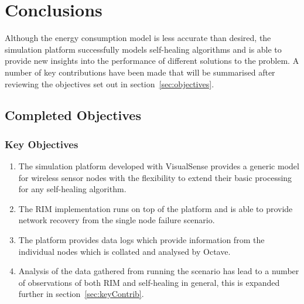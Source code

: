 \documentclass[authoryearcitations]{UoYCSproject}
\begin{document}

\chapter{Conclusions}
\label{cha:Conclusion}

%

Although the energy consumption model is less accurate than desired, the simulation platform successfully models self-healing algorithms and is able to provide new insights into the performance of different solutions to the problem. A number of key contributions have been made that will be summarised after reviewing the objectives set out in section~\ref{sec:objectives}.

\section{Completed Objectives}

\subsection{Key Objectives}
\begin{enumerate}
\item The simulation platform developed with VisualSense provides a generic model for wireless sensor nodes with the flexibility to extend their basic processing for any self-healing algorithm.
\item The RIM implementation runs on top of the platform and is able to provide network recovery from the single node failure scenario.
\item The platform provides data logs which provide information from the individual nodes which is collated and analysed by Octave.
\item Analysis of the data gathered from running the scenario has lead to a number of observations of both RIM and self-healing in general, this is expanded further in section~\ref{sec:keyContrib}.
\end{enumerate}
\end{document}
